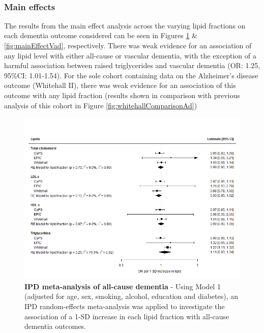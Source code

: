 \documentclass[a4paper, twoside]{templates/ociamthesis}
\begin{document}
~

\hypertarget{main-effects}{%
\subsubsection{Main effects}\label{main-effects}}

The results from the main effect analysis across the varying lipid fractions on each dementia outcome considered can be seen in Figures \ref{fig:mainEffectDem} \& \ref{fig:mainEffectVad}, respectively. There was weak evidence for an association of any lipid level with either all-cause or vascular dementia, with the exception of a harmful association between raised triglycerides and vascular dementia (OR: 1.25, 95\%CI: 1.01-1.54). For the sole cohort containing data on the Alzheimer's disease outcome (Whitehall II), there was weak evidence for an association of this outcome with any lipid fraction (results shown in comparison with previous analysis of this cohort in Figure \ref{fig:whitehallComparisonAd})





\begin{figure}[H]
\includegraphics[width=1\linewidth]{figures/ipd/main_Dementia} \caption[IPD meta-analysis of all-cause dementia]{\textbf{IPD meta-analysis of all-cause dementia} - Using Model 1 (adjusted for age, sex, smoking, alcohol, education and diabetes), an IPD random-effects meta-analysis was applied to investigate the association of a 1-SD increase in each lipid fraction with all-cause dementia outcomes.}\label{fig:mainEffectDem}
\end{figure}
\end{document}
